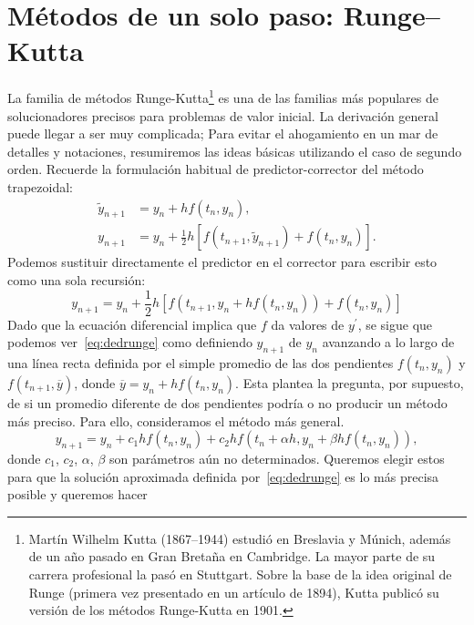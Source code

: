 \section{Métodos de un solo paso: Runge--Kutta}
La familia de métodos Runge-Kutta\footnote{Martín Wilhelm Kutta (1867--1944) estudió en Breslavia y Múnich, además de un año pasado en Gran Bretaña en Cambridge. La mayor parte de su carrera profesional la pasó en Stuttgart. Sobre la base de la idea original de Runge (primera vez presentado en un artículo de 1894), Kutta publicó su versión de los métodos Runge-Kutta en 1901.} es una de las familias más populares de solucionadores precisos para problemas de valor inicial. La derivación general puede llegar a ser muy complicada; Para evitar el ahogamiento en un mar de detalles y notaciones, resumiremos las ideas básicas utilizando el caso de segundo orden. Recuerde la formulación habitual de predictor-corrector del método trapezoidal:
\begin{align*}
\tilde{y}_{n+1}
&=y_{n}+hf\left(t_{n},y_{n}\right),\\
y_{n+1}
&=y_{n}+\frac{1}{2}h\left[f\left(t_{n+1},\tilde{y}_{n+1}\right)+f\left(t_{n},y_{n}\right)\right].
\end{align*}
Podemos sustituir directamente el predictor en el corrector para escribir esto como una sola recursión:
\begin{equation}\label{eq:dedrunge}
y_{n+1}=
y_{n}+\frac{1}{2}h\left[f\left(t_{n+1},y_{n}+hf\left(t_{n},y_{n}\right)\right)+f\left(t_{n},y_{n}\right)\right]
\end{equation}
Dado que la ecuación diferencial implica que $f$ da valores de $y^{\prime}$, se sigue que podemos ver~\eqref{eq:dedrunge} como definiendo $y_{n+1}$ de $y_{n}$ avanzando a lo largo de una línea recta definida por el simple promedio de las dos pendientes $f\left(t_{n},y_{n}\right)$ y $f\left(t_{n+1},\overline{y}\right)$, donde $\overline{y}=y_{n}+hf\left(t_{n},y_{n}\right)$. Esta plantea la pregunta, por supuesto, de si un promedio diferente de dos pendientes podría o no producir un método más preciso. Para ello, consideramos el método más general.
\begin{equation}\label{eq:casirunge}
y_{n+1}=y_{n}+c_{1}hf\left(t_{n},y_{n}\right)+c_{2}hf\left(t_{n}+\alpha h, y_{n}+\beta hf\left(t_{n},y_{n}\right)\right),
\end{equation}
donde $c_{1}$, $c_{2}$, $\alpha$, $\beta$ son parámetros aún no determinados. Queremos elegir estos para que la solución aproximada definida por~\eqref{eq:dedrunge} es lo más precisa posible y queremos hacer
